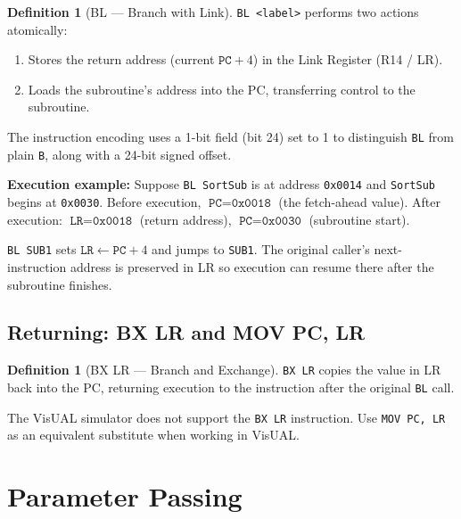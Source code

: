 \documentclass[11pt, a4paper, notitlepage]{report}
\theoremstyle{definition}
\newtheorem{definition}[theorem]{Definition}
\theoremstyle{remark}
\theoremstyle{definition}
\begin{document}
\begin{definition}[BL --- Branch with Link]
\label{def:bl}
\texttt{BL <label>} performs two actions atomically:
\begin{enumerate}
  \item Stores the return address (current $\texttt{PC} + 4$) in the Link Register (R14 / LR).
  \item Loads the subroutine's address into the PC, transferring control to the subroutine.
\end{enumerate}
The instruction encoding uses a 1-bit field (bit 24) set to 1 to distinguish \texttt{BL} from plain \texttt{B}, along with a 24-bit signed offset.
\end{definition}

\textbf{Execution example:} Suppose \texttt{BL SortSub} is at address \texttt{0x0014} and \texttt{SortSub} begins at \texttt{0x0030}. Before execution, $\texttt{PC} = \texttt{0x0018}$ (the fetch-ahead value). After execution: $\texttt{LR} = \texttt{0x0018}$ (return address), $\texttt{PC} = \texttt{0x0030}$ (subroutine start).

\begin{keyresult}[title={BL Saves the Return Address}]
\texttt{BL SUB1} sets $\texttt{LR} \leftarrow \texttt{PC} + 4$ and jumps to \texttt{SUB1}. The original caller's next-instruction address is preserved in LR so execution can resume there after the subroutine finishes.
\end{keyresult}

\subsection{Returning: BX LR and MOV PC, LR}

\begin{definition}[BX LR --- Branch and Exchange]
\label{def:bx-lr}
\texttt{BX LR} copies the value in LR back into the PC, returning execution to the instruction after the original \texttt{BL} call.
\end{definition}

\begin{warning}[title={VisUAL Does Not Support BX LR}]
The VisUAL simulator does not support the \texttt{BX LR} instruction. Use \texttt{MOV PC, LR} as an equivalent substitute when working in VisUAL\@.
\end{warning}

\section{Parameter Passing}
\end{document}
